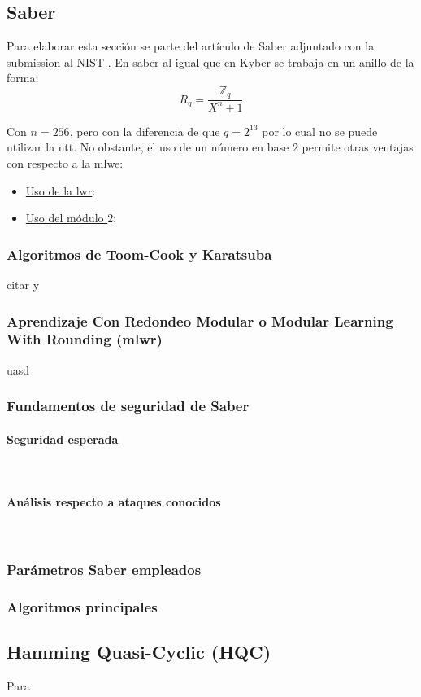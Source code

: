 \subsection{Saber}
Para elaborar esta sección se parte del artículo de Saber adjuntado con la submission al NIST \cite{saber-spec-2020}. En saber al igual que en Kyber se trabaja en un anillo de la forma:
\begin{equation}
	R_q=\dfrac{\mathbb{Z}_q}{X^n+1}
\end{equation}

Con \(n=256\), pero con la diferencia de que \(q=2^{13}\) por lo cual no se puede utilizar la \gls{ntt}. No obstante, el uso de un número en base \(2\) permite otras ventajas \cite{modlwr} con respecto a la \gls{mlwe}:
\begin{itemize}
	\item \underline{Uso de la \gls{lwr}}:
	\item  \underline{Uso del módulo \(2\)}:
\end{itemize}
\subsubsection{Algoritmos de Toom-Cook y Karatsuba}
citar \cite{Karatsuba} y \cite{ToomCook}
\subsubsection{Aprendizaje Con Redondeo Modular o Modular Learning With Rounding (\gls{mlwr})} 
uasd \cite{modlwr}
\subsubsection{Fundamentos de seguridad de Saber}
\paragraph{Seguridad esperada}
\mbox{}\\
\paragraph{Análisis respecto a ataques conocidos}
\mbox{}\\
\subsubsection{Parámetros Saber empleados}
\subsubsection{Algoritmos principales \cite{saber-spec-2020}}
\subsection{Hamming Quasi-Cyclic (HQC)}
Para  \cite{hqc-spec-2022}


